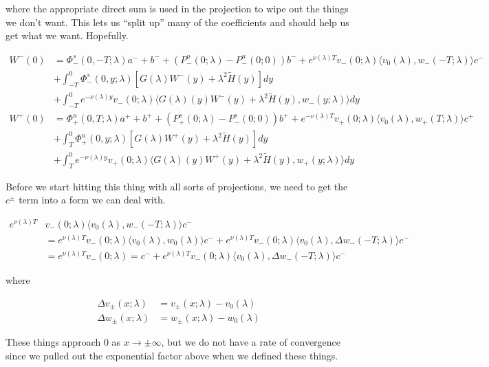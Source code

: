 \documentclass[12pt]{article}
\begin{document}
\begin{enumerate}
where the appropriate direct sum is used in the projection to wipe out the things we don't want. This lets us ``split up'' many of the coefficients and should help us get what we want. Hopefully.

\begin{align*}
W^-(0) &= \Phi^s_-(0, -T; \lambda )a^- + b^- + (P^u_-(0; \lambda) - P^u_-(0; 0))b^- + e^{\nu(\lambda)T} v_-(0; \lambda) \langle v_0(\lambda), w_-(-T; \lambda) \rangle c^- \\
&+ \int_{-T}^0 \Phi^s_-(0, y; \lambda) [ G(\lambda)W^-(y) + \lambda^2 \tilde{H}(y) ] dy \\
&+ \int_{-T}^0 
e^{-\nu(\lambda)y} v_-(0; \lambda) \langle G(\lambda)(y)W^-(y) + \lambda^2 \tilde{H}(y), w_-(y; \lambda) \rangle dy \\
W^+(0) &= \Phi^u_+(0, T; \lambda)a^+ + b^+ + (P^s_+(0; \lambda) - P^s_-(0; 0))b^+ + e^{-\nu(\lambda)T} v_+(0; \lambda) \langle v_0(\lambda), w_+(T; \lambda) \rangle c^+ \\
&+ \int_T^0 \Phi^u_+(0, y; \lambda) [ G(\lambda)W^+(y) + \lambda^2 \tilde{H}(y) ] dy \\
&+ \int_T^0 e^{-\nu(\lambda)y} v_+(0; \lambda) \langle G(\lambda)(y)W^+(y) + \lambda^2 \tilde{H}(y), w_+(y; \lambda) \rangle dy
\end{align*}

Before we start hitting this thing with all sorts of projections, we need to get the $c^\pm$ term into a form we can deal with. 

\begin{align*}
e^{\nu(\lambda)T} &v_-(0; \lambda) \langle v_0(\lambda), w_-(-T; \lambda) \rangle c^- \\
&= e^{\nu(\lambda)T} v_-(0; \lambda) \langle v_0(\lambda), w_0(\lambda) \rangle c^- + e^{\nu(\lambda)T} v_-(0; \lambda) \langle v_0(\lambda), \Delta w_-(-T; \lambda) \rangle c^- \\
&= e^{\nu(\lambda)T} v_-(0; \lambda)= c^- + e^{\nu(\lambda)T} v_-(0; \lambda) \langle v_0(\lambda), \Delta w_-(-T; \lambda) \rangle c^- 
\end{align*}

where 

\begin{align*}
\Delta v_\pm(x; \lambda) &= v_\pm(x; \lambda) - v_0(\lambda) \\
\Delta w_\pm(x; \lambda) &= w_\pm(x; \lambda) - w_0(\lambda)
\end{align*}

These things approach 0 as $x \rightarrow \pm \infty$, but we do not have a rate of convergence since we pulled out the exponential factor above when we defined these things.\\


\end{enumerate}
\end{document}
